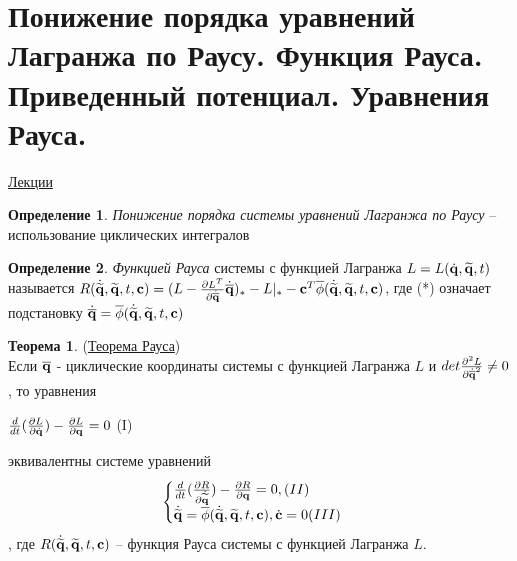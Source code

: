 \documentclass[specialist, subf, href, colorlinks=true, 12pt, times, mtpro, final]{disser}
\theoremstyle{definition}
\newtheorem{defn}{Определение}[section]
\newtheorem{theorem}{Теорема}[section]
\begin{document}
    
    
    \section{Понижение порядка уравнений Лагранжа по Раусу. Функция Рауса. Приведенный потенциал. Уравнения Рауса.}
     \label{9}
    \hyperlink {lects.3}{Лекции} \\
    
    \begin{defn} 
    { \it Понижение порядка системы уравнений Лагранжа по Раусу} \---
    	использование циклических интегралов\\
    \end{defn}
    
    \begin{defn} 
    { \it Функцией Рауса} системы с функцией Лагранжа $L=L(\dot{\mathbf{q}}, \widetilde{\mathbf{q}}, t)$ называется $R(\dot{\widetilde{\mathbf{q}}}, \widetilde{\mathbf{q}}, t, \mathbf{c}) = (L - \frac{\partial L^T}{\partial \dot{\overline{\mathbf{q}}}} \dot{\overline{\mathbf{q}}})_{*} - L|_{*} - \mathbf{c}^T\overline{\phi}(\dot{\widetilde{\mathbf{q}}}, \widetilde{\mathbf{q}}, t, \mathbf{c})$, где (*) означает подстановку $\dot{\overline{\mathbf{q}}} = \overline{\phi} (\dot{\widetilde{\mathbf{q}}}, \widetilde{\mathbf{q}}, t, \mathbf{c})$
    \end{defn}
    
    \begin{theorem}(\hyperlink {lects.4}{Теорема Рауса})\\
    Если $\overline{\mathbf{q}}$ - циклические координаты системы с функцией Лагранжа $L$ и $det \frac{\partial^2 L}{\partial \dot{\overline{\mathbf{q}}}^2} \neq 0$, то уравнения 
    \begin{center}
    $\frac{d}{dt} (\frac{\partial L}{\partial \dot{\mathbf{q}}}) - \frac{\partial L}{\partial \mathbf{q}} = 0$   (I)
    \end{center}
    эквивалентны системе уравнений
    \begin{equation*}
 		\begin{cases}
  			 \frac{d}{dt}(\frac{\partial R}{\partial \dot{\widetilde{\mathbf{q}}}}) - \frac{\partial R}{\partial \mathbf{q}} = 0,   (II)
   				\\
  			 \dot{\widetilde{\mathbf{q}}} = \overline{\phi} (\dot{\widetilde{\mathbf{q}}}, \widetilde{\mathbf{q}}, t, \mathbf{c}), \dot{\mathbf{c}} = 0  (III)
  				
		\end{cases}
	\end{equation*}, где $R(\dot{\widetilde{\mathbf{q}}}, \widetilde{\mathbf{q}}, t, \mathbf{c})$ \--- функция Рауса системы с функцией Лагранжа $L$.
    \end{theorem}
    
\end{document}
